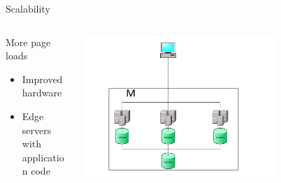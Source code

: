\begin{frame}{Scalability}{}
  \begin{columns}[T]
    \begin{column}{.5\textwidth}
     \begin{block}{More page loads}
  		\begin{itemize}
  			\item Improved hardware
  			\item Edge servers with application code
  		\end{itemize}
			\end{block}
		\end{column}
    \begin{column}{.5\textwidth}
    \begin{block}{}
    \begin{center}
    \includegraphics[width=0.7\textwidth]{images/master_edge.pdf}
    \end{center}
    \end{block}
    \end{column}
    \end{columns}
\end{frame}

